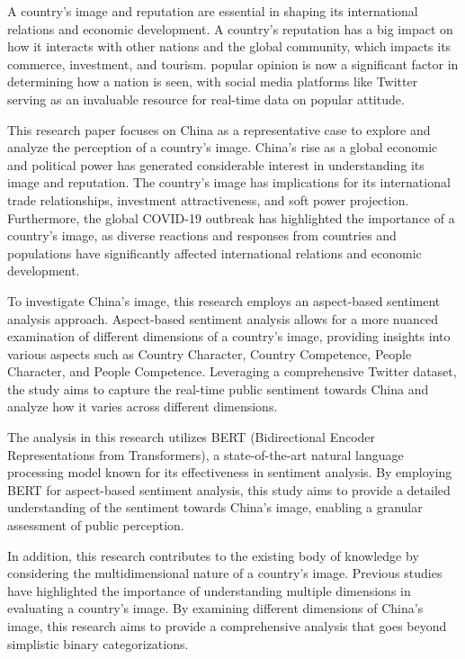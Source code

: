 \documentclass[conference]{IEEEtran}
\begin{document}
A country's image and reputation are essential in shaping its international relations and economic development. A country's reputation has a big impact on how it interacts with other nations and the global community, which impacts its commerce, investment, and tourism. popular opinion is now a significant factor in determining how a nation is seen, with social media platforms like Twitter serving as an invaluable resource for real-time data on popular attitude. 

This research paper focuses on China as a representative case to explore and analyze the perception of a country's image. China's rise as a global economic and political power has generated considerable interest in understanding its image and reputation. The country's image has implications for its international trade relationships, investment attractiveness, and soft power projection. Furthermore, the global COVID-19 outbreak has highlighted the importance of a country's image, as diverse reactions and responses from countries and populations have significantly affected international relations and economic development. 

To investigate China's image, this research employs an aspect-based sentiment analysis approach. Aspect-based sentiment analysis allows for a more nuanced examination of different dimensions of a country's image, providing insights into various aspects such as Country Character, Country Competence, People Character, and People Competence. Leveraging a comprehensive Twitter dataset, the study aims to capture the real-time public sentiment towards China and analyze how it varies across different dimensions.  

The analysis in this research utilizes BERT (Bidirectional Encoder Representations from Transformers), a state-of-the-art natural language processing model known for its effectiveness in sentiment analysis. By employing BERT for aspect-based sentiment analysis, this study aims to provide a detailed understanding of the sentiment towards China's image, enabling a granular assessment of public perception. 

In addition, this research contributes to the existing body of knowledge by considering the multidimensional nature of a country's image. Previous studies have highlighted the importance of understanding multiple dimensions in evaluating a country's image. By examining different dimensions of China's image, this research aims to provide a comprehensive analysis that goes beyond simplistic binary categorizations. 
\end{document}
